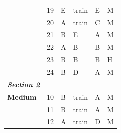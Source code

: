 \documentclass[pageno]{jpaper}
\newcommand{\textbi}[1]{\textbf{\textit{#1}}}
\begin{document}
\begin{table}[]
\begin{tabular}{llllll}
\textbf{}                & 19                                  & E                                          & train                                       & E                                           & M                                       \\
\textbf{}                & 20                                  & A                                          & train                                       & C                                           & M                                       \\
\textbf{}                & 21                                  & B                                          & E                                           & A                                           & M                                       \\
\textbf{}                & 22                                  & A                                          & B                                           & B                                           & M                                       \\
\textbf{}                & 23                                  & B                                          & B                                           & B                                           & H                                       \\
\textbf{}                & 24                                  & B                                          & D                                           & A                                           & M                                       \\ \midrule
\textbi{Section 2}       &                                     &                                            &                                             &                                             &                                         \\ \midrule
\textbf{Medium}          & 10                                  & B                                          & train                                       & A                                           & M                                       \\
\textbf{}                & 11                                  & B                                          & train                                       & A                                           & M                                       \\
\textbf{}                & 12                                  & A                                          & train                                       & D                                           & M                                       \\

\end{tabular}
\end{table}
\end{document}
